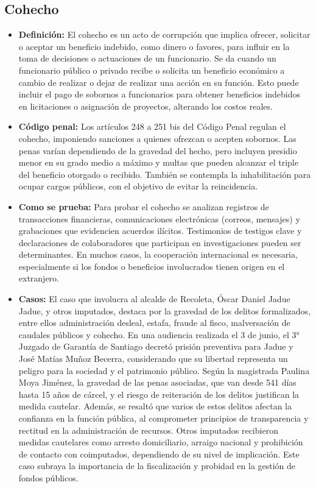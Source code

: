 \documentclass[letter,12pt]{article}
\begin{document}
	\subsection{Cohecho}
	\begin{itemize}
		\item \textbf{Definición: }El cohecho es un acto de corrupción que implica ofrecer, solicitar o aceptar un beneficio indebido, como dinero o favores, para influir en la toma de decisiones o actuaciones de un funcionario. Se da cuando un funcionario público o privado recibe o solicita un beneficio económico a cambio de realizar o dejar de realizar una acción en su función. Esto puede incluir el pago de sobornos a funcionarios para obtener beneficios indebidos en licitaciones o asignación de proyectos, alterando los costos reales.\\
		
		\item \textbf{Código penal: }Los artículos 248 a 251 bis del Código Penal regulan el cohecho, imponiendo sanciones a quienes ofrezcan o acepten sobornos. Las penas varían dependiendo de la gravedad del hecho, pero incluyen presidio menor en su grado medio a máximo y multas que pueden alcanzar el triple del beneficio otorgado o recibido. También se contempla la inhabilitación para ocupar cargos públicos, con el objetivo de evitar la reincidencia.\\
		
		\item \textbf{Como se prueba: }Para probar el cohecho se analizan registros de transacciones financieras, comunicaciones electrónicas (correos, mensajes) y grabaciones que evidencien acuerdos ilícitos. Testimonios de testigos clave y declaraciones de colaboradores que participan en investigaciones pueden ser determinantes. En muchos casos, la cooperación internacional es necesaria, especialmente si los fondos o beneficios involucrados tienen origen en el extranjero.\\
		
		\item \textbf{Casos: }El caso que involucra al alcalde de Recoleta, Óscar Daniel Jadue Jadue, y otros imputados, destaca por la gravedad de los delitos formalizados, entre ellos administración desleal, estafa, fraude al fisco, malversación de caudales públicos y cohecho. En una audiencia realizada el 3 de junio, el 3° Juzgado de Garantía de Santiago decretó prisión preventiva para Jadue y José Matías Muñoz Becerra, considerando que su libertad representa un peligro para la sociedad y el patrimonio público. Según la magistrada Paulina Moya Jiménez, la gravedad de las penas asociadas, que van desde 541 días hasta 15 años de cárcel, y el riesgo de reiteración de los delitos justifican la medida cautelar. Además, se resaltó que varios de estos delitos afectan la confianza en la función pública, al comprometer principios de transparencia y rectitud en la administración de recursos. Otros imputados recibieron medidas cautelares como arresto domiciliario, arraigo nacional y prohibición de contacto con coimputados, dependiendo de su nivel de implicación. Este caso subraya la importancia de la fiscalización y probidad en la gestión de fondos públicos.\cite{cohecho}\\
		

\end{itemize}
\end{document}
